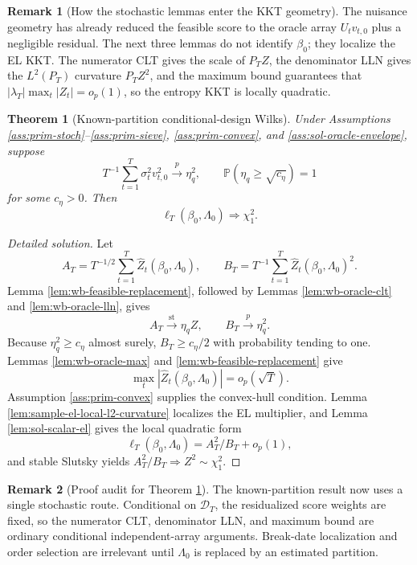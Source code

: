 \documentclass[12pt]{article}
\numberwithin{equation}{section}
\newtheorem{theorem}{Theorem}
\theoremstyle{definition}
\newtheorem{remark}{Remark}
\newcommand{\Pp}{\mathbb P}
\newcommand{\D}{\mathcal D}
\begin{document}
\begin{remark}[How the stochastic lemmas enter the KKT geometry]
The nuisance geometry has already reduced the feasible score to the oracle
array \(U_tv_{t,0}\) plus a negligible residual. The next three lemmas do not
identify \(\beta_0\); they localize the EL KKT. The numerator CLT gives the
scale of \(P_TZ\), the denominator LLN gives the \(L^2(P_T)\) curvature
\(P_TZ^2\), and the maximum bound guarantees that
\(|\lambda_T|\max_t|Z_t|=o_p(1)\), so the entropy KKT is locally quadratic.
\end{remark}
\begin{theorem}[Known-partition conditional-design Wilks]
\label{thm:wb-known-wilks}
Under Assumptions \ref{ass:prim-stoch}--\ref{ass:prim-sieve},
\ref{ass:prim-convex}, and \ref{ass:sol-oracle-envelope}, suppose
\[
    T^{-1}\sum_{t=1}^T \sigma_t^2v_{t,0}^2\xrightarrow{p}\eta_q^2,
    \qquad
    \Pp(\eta_q\geq\sqrt{c_\eta})=1
\]
for some \(c_\eta>0\).  Then
\[
    \ell_T(\beta_0,\Lambda_0)\Rightarrow\chi_1^2.
\]
\end{theorem}

\begin{proof}[Detailed solution]
Let
\[
    A_T=T^{-1/2}\sum_{t=1}^T
       \widehat Z_t(\beta_0,\Lambda_0),
    \qquad
    B_T=T^{-1}\sum_{t=1}^T
       \widehat Z_t(\beta_0,\Lambda_0)^2.
\]
Lemma \ref{lem:wb-feasible-replacement}, followed by Lemmas
\ref{lem:wb-oracle-clt} and \ref{lem:wb-oracle-lln}, gives
\[
    A_T\xrightarrow{\mathrm{st}}\eta_qZ,
    \qquad
    B_T\xrightarrow{p}\eta_q^2.
\]
Because \(\eta_q^2\geq c_\eta\) almost surely, \(B_T\geq c_\eta/2\) with
probability tending to one.  Lemmas \ref{lem:wb-oracle-max} and
\ref{lem:wb-feasible-replacement} give
\[
    \max_t|\widehat Z_t(\beta_0,\Lambda_0)|=o_p(\sqrt T).
\]
Assumption \ref{ass:prim-convex} supplies the convex-hull condition.  Lemma
\ref{lem:sample-el-local-l2-curvature} localizes the EL multiplier, and Lemma
\ref{lem:sol-scalar-el} gives the local quadratic form
\[
    \ell_T(\beta_0,\Lambda_0)=A_T^2/B_T+o_p(1),
\]
and stable Slutsky yields \(A_T^2/B_T\Rightarrow Z^2\sim\chi_1^2\).
\end{proof}

\begin{remark}[Proof audit for Theorem \ref{thm:wb-known-wilks}]
The known-partition result now uses a single stochastic route.  Conditional on
\(\D_T\), the residualized score weights are fixed, so the numerator CLT,
denominator LLN, and maximum bound are ordinary conditional independent-array
arguments.  Break-date localization and order selection are irrelevant until
\(\Lambda_0\) is replaced by an estimated partition.
\end{remark}
\end{document}
